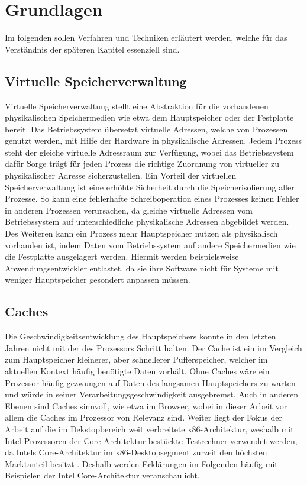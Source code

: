\chapter{Grundlagen}
\label{chapter:basics}

Im folgenden sollen Verfahren und Techniken erläutert werden, welche für das Verständnis der späteren Kapitel essenziell sind.

\section{Virtuelle Speicherverwaltung}

Virtuelle Speicherverwaltung stellt eine Abstraktion für die vorhandenen physikalischen Speichermedien wie etwa dem Hauptspeicher oder der Festplatte bereit.
Das Betriebssystem übersetzt virtuelle Adressen, welche von Prozessen genutzt werden, mit Hilfe der Hardware in physikalische Adressen. 
Jedem Prozess steht der gleiche virtuelle Adressraum zur Verfügung, wobei das Betriebssystem dafür Sorge trägt für jeden Prozess die richtige Zuordnung von virtueller zu physikalischer Adresse sicherzustellen.
Ein Vorteil der virtuellen Speicherverwaltung ist eine erhöhte Sicherheit durch die Speicherisolierung aller Prozesse. 
So kann eine fehlerhafte Schreiboperation eines Prozesses keinen Fehler in anderen Prozessen verursachen, da gleiche virtuelle Adressen vom Betriebssystem auf unterschiedliche physikalische Adressen abgebildet werden. 
Des Weiteren kann ein Prozess mehr Hauptspeicher nutzen als physikalisch vorhanden ist, indem Daten vom Betriebssystem auf andere Speichermedien wie die Festplatte ausgelagert werden. Hiermit werden beispielsweise Anwendungsentwickler entlastet, da sie ihre Software nicht für Systeme mit weniger Hauptspeicher gesondert anpassen müssen.

\section{Caches}

Die Geschwindigkeitsentwicklung des Hauptspeichers konnte in den letzten Jahren nicht mit der des Prozessors Schritt halten. Der Cache ist ein im Vergleich zum Hauptspeicher kleinerer, aber schnellerer Pufferspeicher, welcher im aktuellen Kontext häufig benötigte Daten vorhält. 
Ohne Caches wäre ein Prozessor häufig gezwungen auf Daten des langsamen Hauptspeichers zu warten und würde in seiner Verarbeitungsgeschwindigkeit ausgebremst. 
Auch in anderen Ebenen sind Caches sinnvoll, wie etwa im Browser, wobei in dieser Arbeit vor allem die Caches im Prozessor von Relevanz sind. 
Weiter liegt der Fokus der Arbeit auf die im Dekstopbereich weit verbreitete x86-Architektur, weshalb mit Intel-Prozessoren der Core-Architektur bestückte Testrechner verwendet werden, da Intels Core-Architektur im x86-Desktopsegment zurzeit den höchsten Marktanteil besitzt \cite{AMDIntelMarketShare}. Deshalb werden Erklärungen im Folgenden häufig mit Beispielen der Intel Core-Architektur veranschaulicht.

